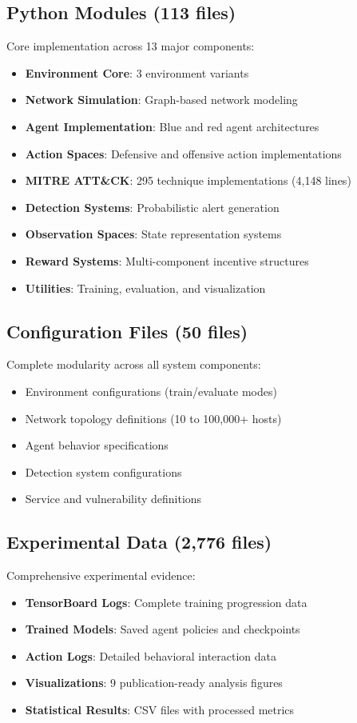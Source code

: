 \documentclass[11pt]{article}
\begin{document}
\subsection{Python Modules (113 files)}
Core implementation across 13 major components:
\begin{itemize}
\item \textbf{Environment Core}: 3 environment variants
\item \textbf{Network Simulation}: Graph-based network modeling
\item \textbf{Agent Implementation}: Blue and red agent architectures
\item \textbf{Action Spaces}: Defensive and offensive action implementations
\item \textbf{MITRE ATT\&CK}: 295 technique implementations (4,148 lines)
\item \textbf{Detection Systems}: Probabilistic alert generation
\item \textbf{Observation Spaces}: State representation systems
\item \textbf{Reward Systems}: Multi-component incentive structures
\item \textbf{Utilities}: Training, evaluation, and visualization
\end{itemize}

\subsection{Configuration Files (50 files)}
Complete modularity across all system components:
\begin{itemize}
\item Environment configurations (train/evaluate modes)
\item Network topology definitions (10 to 100,000+ hosts)
\item Agent behavior specifications
\item Detection system configurations
\item Service and vulnerability definitions
\end{itemize}

\subsection{Experimental Data (2,776 files)}
Comprehensive experimental evidence:
\begin{itemize}
\item \textbf{TensorBoard Logs}: Complete training progression data
\item \textbf{Trained Models}: Saved agent policies and checkpoints
\item \textbf{Action Logs}: Detailed behavioral interaction data
\item \textbf{Visualizations}: 9 publication-ready analysis figures
\item \textbf{Statistical Results}: CSV files with processed metrics
\end{itemize}
\end{document}
